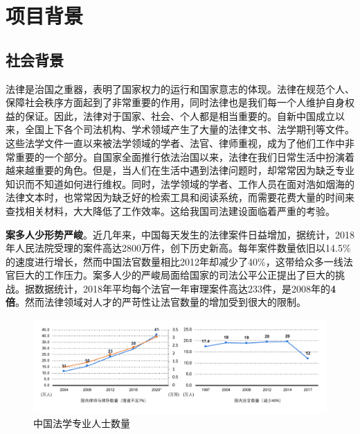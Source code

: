 \chapter{项目背景}
\label{cha:background}


\section{社会背景}
法律是治国之重器，表明了国家权力的运行和国家意志的体现。法律在规范个人、保障社会秩序方面起到了非常重要的作用，同时法律也是我们每一个人维护自身权益的保证。因此，法律对于国家、社会、个人都是相当重要的。自新中国成立以来，全国上下各个司法机构、学术领域产生了大量的法律文书、法学期刊等文件。这些法学文件一直以来被法学领域的学者、法官、律师重视，成为了他们工作中非常重要的一个部分。自国家全面推行依法治国以来，法律在我们日常生活中扮演着越来越重要的角色。但是，当人们在生活中遇到法律问题时，却常常因为缺乏专业知识而不知道如何进行维权。同时，法学领域的学者、工作人员在面对浩如烟海的法律文本时，也常常因为缺乏好的检索工具和阅读系统，而需要花费大量的时间来查找相关材料，大大降低了工作效率。这给我国司法建设面临着严重的考验。

\textbf{案多人少形势严峻}。近几年来，中国每天发生的法律案件日益增加，据统计，2018年人民法院受理的案件高达2800万件，创下历史新高。每年案件数量依旧以14.5\%的速度进行增长，然而中国法官数量相比2012年却减少了40\%，这带给众多一线法官巨大的工作压力。案多人少的严峻局面给国家的司法公平公正提出了巨大的挑战。据数据统计，2018年平均每个法官一年审理案件高达233件，是2008年的\textbf{4倍}。然而法律领域对人才的严苛性让法官数量的增加受到很大的限制。

\begin{figure}[ht]
    \centering
    \includegraphics[width=\linewidth]{figures/professional_num}
    \caption{中国法学专业人士数量}
    \label{fig:professional_num}
\end{figure}

